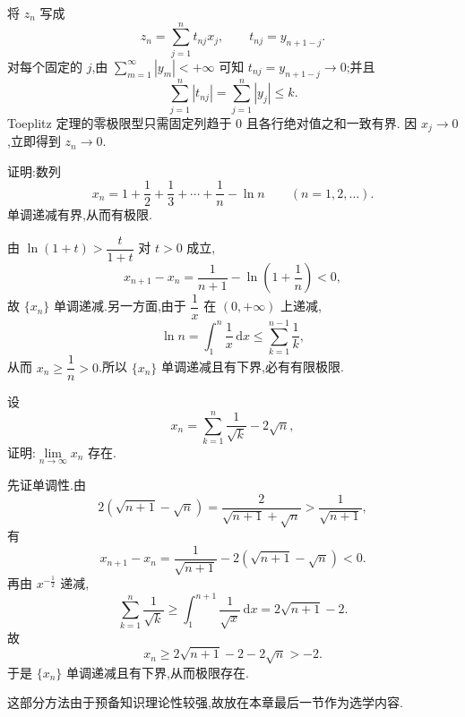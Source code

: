 \begin{solution}
  将 $z_n$ 写成
  \[
    z_n=\sum\limits_{j=1}^n t_{nj}x_j,
    \qquad t_{nj}=y_{n+1-j}.
  \]
  对每个固定的 $j$,由
  $\displaystyle\sum\limits_{m=1}^{\infty}|y_m|<+\infty$ 可知
  $t_{nj}=y_{n+1-j}\to0$;并且
  \[
    \displaystyle\sum\limits_{j=1}^n|t_{nj}|
    =\sum\limits_{j=1}^n|y_j|\leq k.
  \]
  Toeplitz 定理的零极限型只需固定列趋于 $0$ 且各行绝对值之和一致有界.
  因 $x_j\to0$,立即得到 $z_n\to0$.
\end{solution}




\begin{example}
  证明:数列
  \[
    x_n=1+\dfrac{1}{2}+\dfrac{1}{3}+\cdots+\dfrac{1}{n}-\ln n
    \qquad(n=1,2,\ldots).
  \]
  单调递减有界,从而有极限.
\end{example}
\exampleblank

\begin{solution}
  由 $\ln(1+t)>\dfrac{t}{1+t}$ 对 $t>0$ 成立,
  \[
    x_{n+1}-x_n
    =\dfrac{1}{n+1}-\ln\left(1+\dfrac{1}{n}\right)<0,
  \]
  故 $\{x_n\}$ 单调递减.另一方面,由于 $\dfrac{1}{x}$ 在 $(0,+\infty)$ 上递减,
  \[
    \ln n=\int_1^n\dfrac{1}{x}\,\mathrm{d}x
    \leq\sum\limits_{k=1}^{n-1}\dfrac{1}{k},
  \]
  从而 $x_n\geq\dfrac{1}{n}>0$.所以 $\{x_n\}$ 单调递减且有下界,必有有限极限.
\end{solution}

\begin{example}
  设
  \[
    x_n=\sum\limits_{k=1}^n\dfrac{1}{\sqrt{k}}-2\sqrt{n},
  \]
  证明:$\displaystyle \lim\limits_{n\to\infty}x_n$ 存在.
\end{example}
\exampleblank

\begin{solution}
  先证单调性.由
  \[
    2(\sqrt{n+1}-\sqrt n)
    =\dfrac{2}{\sqrt{n+1}+\sqrt n}
    >\dfrac{1}{\sqrt{n+1}},
  \]
  有
  \[
    x_{n+1}-x_n
    =\dfrac{1}{\sqrt{n+1}}-2(\sqrt{n+1}-\sqrt n)<0.
  \]
  再由 $x^{-\frac{1}{2}}$ 递减,
  \[
    \displaystyle\sum\limits_{k=1}^n\dfrac{1}{\sqrt k}
    \geq\int_1^{n+1}\dfrac{1}{\sqrt x}\,\mathrm{d}x
    =2\sqrt{n+1}-2.
  \]
  故
  \[
    x_n\geq2\sqrt{n+1}-2-2\sqrt n>-2.
  \]
  于是 $\{x_n\}$ 单调递减且有下界,从而极限存在.
\end{solution}




这部分方法由于预备知识理论性较强,故放在本章最后一节作为选学内容.




